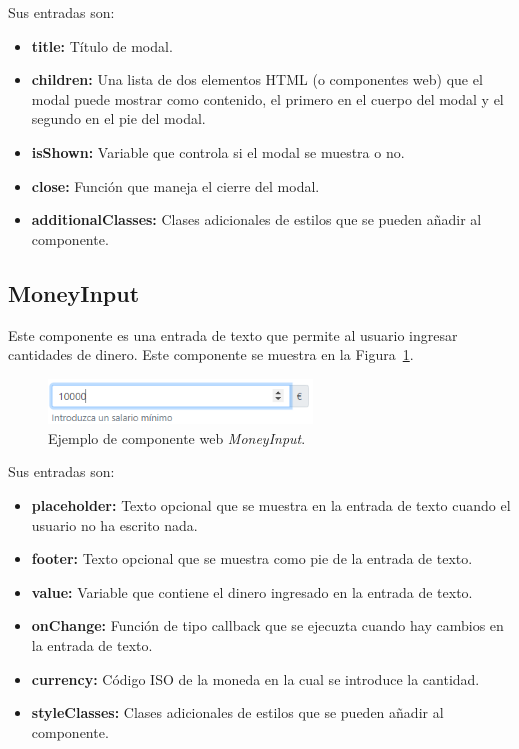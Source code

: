 \documentclass[a4paper, 12pt]{book}
\begin{document}
    Sus entradas son:

    \begin{itemize}
        \item \textbf{title:} Título de modal.
        \item \textbf{children:} Una lista de dos elementos HTML (o componentes web) que el modal puede mostrar como contenido, el primero en el cuerpo del modal y el segundo en el pie del modal.
        \item \textbf{isShown:} Variable que controla si el modal se muestra o no.
        \item \textbf{close:} Función que maneja el cierre del modal.
        \item \textbf{additionalClasses:} Clases adicionales de estilos que se pueden añadir al componente.
    \end{itemize}

    \subsection{MoneyInput}
    \label{subsec:wc_money_input}
    Este componente es una entrada de texto que permite al usuario ingresar cantidades de dinero.
    Este componente se muestra en la Figura~\ref{fig:component_money_input}.

    \begin{figure}
        \centering
        \includegraphics[width=7cm, keepaspectratio]{img/MoneyInput.PNG}
        \caption{Ejemplo de componente web \emph{MoneyInput}.}\label{fig:component_money_input}
    \end{figure}

    Sus entradas son:

    \begin{itemize}
        \item \textbf{placeholder:} Texto opcional que se muestra en la entrada de texto cuando el usuario no ha escrito nada.
        \item \textbf{footer:} Texto opcional que se muestra como pie de la entrada de texto.
        \item \textbf{value:} Variable que contiene el dinero ingresado en la entrada de texto.
        \item \textbf{onChange:} Función de tipo callback que se ejecuzta cuando hay cambios en la entrada de texto.
        \item \textbf{currency:} Código ISO de la moneda en la cual se introduce la cantidad.
        \item \textbf{styleClasses:} Clases adicionales de estilos que se pueden añadir al componente.
    \end{itemize}
\end{document}
